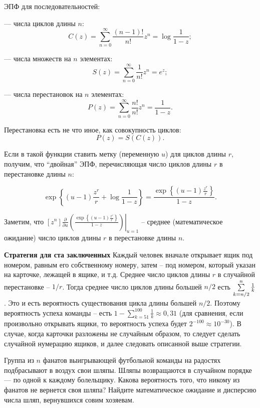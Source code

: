 \begin{ordre}
 ЭПФ для последовательностей: 
 
---  
числа циклов длины $n$:
\[C(z)=\sum _{n=0}^{\infty }\frac{(n-1)!}{n!} z^{n}  =\log \frac{1}{1-z}; \]

--- числа множеств на $n$ элементах:
\[S(z)=\sum _{n=0}^{\infty }\frac{1}{n!} z^{n}  =e^{z}; \]

--- числа перестановок на $n$ элементах:
\[P(z)=\sum _{n=0}^{\infty }\frac{n!}{n!} z^{n}  =\frac{1}{1-z}. \]

Перестановка есть не что иное, как совокупность циклов:
\[P(z)=S\left(C(z)\right).\]

Если в такой функции ставить метку (переменную $u$) для циклов длины $r$, получим, что ``двойная''  ЭПФ, перечисляющая число циклов длины $r$ в перестановке длины $n$:

$$\exp \left\{(u-1)\frac{z^{r} }{r} +\log \frac{1}{1-z} \right\}=\frac{\exp \left\{(u-1)\frac{z^{r} }{r} \right\}}{1-z} .$$

Заметим, что $\left[z^{n} \right]\left. \frac{\partial }{\partial u} \left(\frac{\exp \left\{(u-1)\frac{z^{r} }{r} \right\}}{1-z} \right)\right|_{u=1} $ -- среднее (математическое ожидание) число циклов длины $r$ в перестановке длины $n$.

\textbf{Стратегия для ста заключенных} Каждый человек вначале открывает ящик под номером, равным его собственному номеру, затем -- под номером, который указан на карточке, лежащей в ящике, и т.д. Среднее число циклов длины $r$ в случайной 
перестановке -- $1/r$. Тогда среднее число циклов длины большей $n/2$
есть $\sum\limits_{k=n \mathord{\left/ {\vphantom {n 2}} \right. 
\kern-\nulldelimiterspace} 2}^n {\frac{1}{k}} $. Это и есть вероятность 
существования цикла длины большей $n/2$. Поэтому вероятность успеха команды -- 
есть $1-\sum\limits_{k=51}^{100} {\frac{1}{k}} \approx 0,31$ (для сравнения, если 
произвольно открывать ящики, то вероятность успеха будет 
$2^{-100}\approx 10^{-30}$). В случае, когда карточки 
разложены не случайным образом, то следует сделать случайной нумерацию 
ящиков, и далее следовать описанной выше стратегии.
\end{ordre}

\begin{problem}
\label{permloop}
Группа из $n$ фанатов выигрывающей футбольной команды на радостях 
подбрасывают в воздух свои шляпы. Шляпы возвращаются в случайном порядке ---
по одной к каждому болельщику. Какова вероятность того, что никому из 
фанатов не вернется своя шляпа? Найдите математическое ожидание и дисперсию числа шляп, вернувшихся совим хозяевам.
\end{problem}

